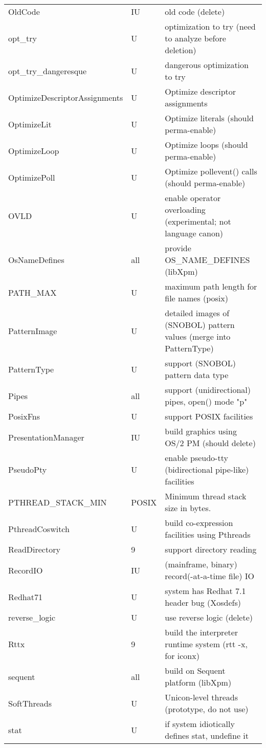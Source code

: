 \begin{xtabular}{|m{1.8in}|m{0.5in}|m{4.0in}|}
OldCode & IU & old code (delete) \\
opt\_try & U & optimization to try (need to analyze before deletion) \\
opt\_try\_dangeresque & U & dangerous optimization to try  \\
OptimizeDescriptorAssignments & U & Optimize descriptor assignments \\
OptimizeLit & U & Optimize literals (should perma-enable) \\
OptimizeLoop & U & Optimize loops (should perma-enable) \\
OptimizePoll & U & Optimize pollevent() calls (should perma-enable) \\
OVLD & U & enable operator overloading (experimental; not language canon) \\
OsNameDefines & all & provide OS\_NAME\_DEFINES (libXpm) \\
PATH\_MAX & U & maximum path length for file names (posix) \\
PatternImage & U & detailed images of (SNOBOL) pattern values (merge into PatternType) \\
PatternType & U & support (SNOBOL) pattern data type \\
Pipes & all & support (unidirectional) pipes, open() mode "p" \\
PosixFns & U & support POSIX facilities \\
PresentationManager & IU & build graphics using OS/2 PM (should delete) \\
PseudoPty & U & enable pseudo-tty (bidirectional pipe-like) facilities \\
PTHREAD\_STACK\_MIN & POSIX & Minimum thread stack size in bytes. \\
PthreadCoswitch & U & build co-expression facilities using Pthreads \\
ReadDirectory & 9 & support directory reading \\
RecordIO & IU & (mainframe, binary) record(-at-a-time file) IO \\
Redhat71 & U & system has Redhat 7.1 header bug (Xosdefs) \\
reverse\_logic & U & use reverse logic (delete) \\
Rttx & 9 & build the interpreter runtime system (rtt -x, for iconx) \\
sequent & all & build on Sequent platform (libXpm) \\
SoftThreads & U & Unicon-level threads (prototype, do not use) \\
stat & U & if system idiotically defines stat, undefine it \\

\end{xtabular}
